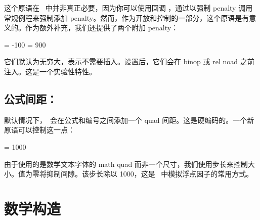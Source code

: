 这个原语在 \LUATEX\ 中并非真正必要，因为你可以使用回调 ，通过以强制 penalty 调用常规例程来强制添加 penalty。然而，作为开放和控制的一部分，这个原语是有意义的。作为额外补充，我们还提供了两个附加 penalty：

\begin{typing}
\prebinoppenalty = -100 %
\prerelpenalty   =  900 %
\end{typing}

它们默认为无穷大，表示不需要插入。设置后，它们会在 binop 或 rel noad 之前注入。这是一个实验性特性。

\subsection{公式间距：}

默认情况下，\TEX\ 会在公式和编号之间添加一个 quad 间距。这是硬编码的。一个新原语可以控制这一点：

\begin{typing}
\matheqnogapstep = 1000
\end{typing}

由于使用的是数学文本字体的 math quad 而非一个尺寸，我们使用步长来控制大小。值为零将抑制间隙。该步长除以 1000，这是 \TEX\ 中模拟浮点因子的常用方式。

\section{数学构造}

